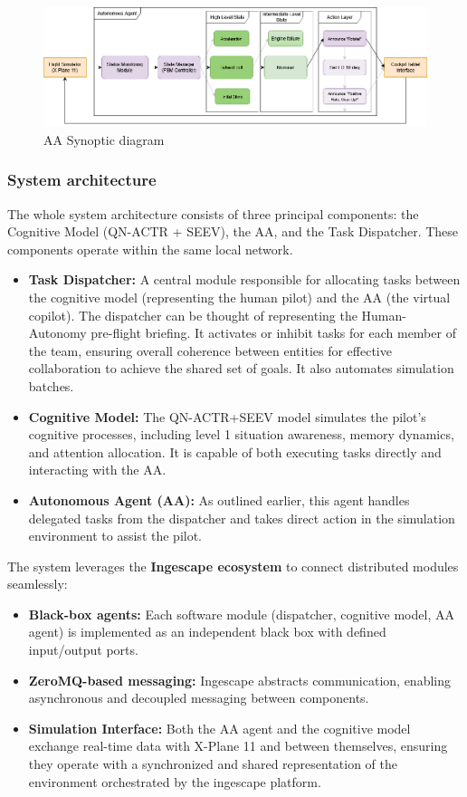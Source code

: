 \documentclass[12pt,a4paper]{article} %
\begin{document}
	\begin{figure}[H]
		\centering
		\includegraphics[width=1.0\textwidth]{./images/AA_synoptic.png}
		\caption{AA Synoptic diagram}
		\label{fig:aa_synoptic}
	\end{figure}
	
	\subsubsection{System architecture}
	The whole system architecture consists of three principal components: the Cognitive Model (QN-ACTR + SEEV), the AA, and the Task Dispatcher. These components operate within the same local network.

	\begin{itemize} 
		\item \textbf{Task Dispatcher:} A central module responsible for allocating tasks between the cognitive model (representing the human pilot) and the AA (the virtual copilot). The dispatcher can be thought of representing the Human-Autonomy pre-flight briefing. It activates or inhibit tasks for each member of the team, ensuring overall coherence between entities for effective collaboration to achieve the shared set of goals. It also automates simulation batches.
		\item \textbf{Cognitive Model:} The QN-ACTR+SEEV model simulates the pilot's cognitive processes, including level 1 situation awareness, memory dynamics, and attention allocation. It is capable of both executing tasks directly and interacting with the AA.
		\item \textbf{Autonomous Agent (AA):} As outlined earlier, this agent handles delegated tasks from the dispatcher and takes direct action in the simulation environment to assist the pilot.
	\end{itemize}

	The system leverages the \textbf{Ingescape ecosystem} to connect distributed modules seamlessly:
	\begin{itemize}
		\item \textbf{Black-box agents:} Each software module (dispatcher, cognitive model, AA agent) is implemented as an independent black box with defined input/output ports.
		\item \textbf{ZeroMQ-based messaging:} Ingescape abstracts communication, enabling asynchronous and decoupled messaging between components.
		\item \textbf{Simulation Interface:} Both the AA agent and the cognitive model exchange real-time data with X-Plane 11 and between themselves, ensuring they operate with a synchronized and shared representation of the environment orchestrated by the ingescape platform.
	\end{itemize}
\end{document}
